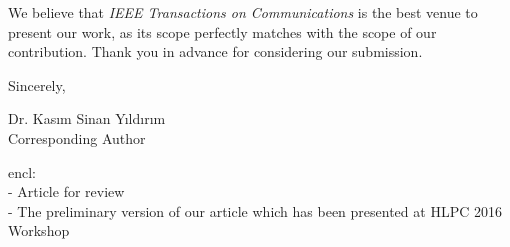 \documentclass[11pt]{article}
\def\Who{Dr. Kas{\i}m Sinan Y{\i}ld{\i}r{\i}m}
\begin{document}
	We believe that \emph{IEEE Transactions on Communications} is 
	the best 
	venue to present our work, as its scope 
	perfectly matches with the scope of our contribution. Thank you in advance for 
	considering our submission.
	
	\vspace{0.3cm}
	
	Sincerely,
	
	\Who \\
	Corresponding Author
	
	encl: \\
	- Article for review \\
	- The preliminary version of our article which has been presented at HLPC 	
	2016 Workshop\\  
	
\end{document}
